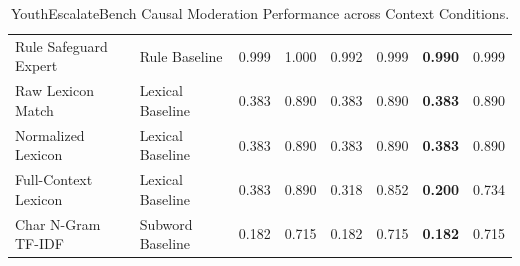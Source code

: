 \begin{table}[t]
\begin{tabular}{llcccccc}
Rule Safeguard Expert & Rule Baseline & 0.999 & 1.000 & 0.992 & 0.999 & \textbf{0.990} & 0.999 \\
Raw Lexicon Match & Lexical Baseline & 0.383 & 0.890 & 0.383 & 0.890 & \textbf{0.383} & 0.890 \\
Normalized Lexicon & Lexical Baseline & 0.383 & 0.890 & 0.383 & 0.890 & \textbf{0.383} & 0.890 \\
Full-Context Lexicon & Lexical Baseline & 0.383 & 0.890 & 0.318 & 0.852 & \textbf{0.200} & 0.734 \\
Char N-Gram TF-IDF & Subword Baseline & 0.182 & 0.715 & 0.182 & 0.715 & \textbf{0.182} & 0.715 \\
\bottomrule
\end{tabular}
\caption{YouthEscalateBench Causal Moderation Performance across Context Conditions.}
\label{tab:main_results}
\end{table}
